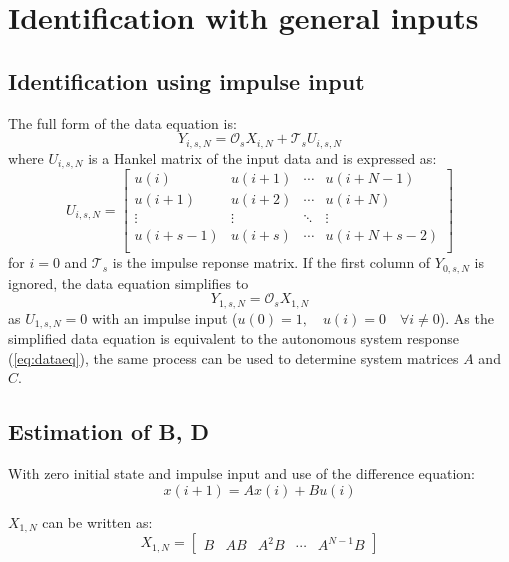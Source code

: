 \documentclass[11pt,a4paper]{article}
\begin{document}
\section{Identification with general inputs}

\subsection{Identification using impulse input}
The full form of the data equation is:
\begin{equation}
    \label{eq:fulldataeq}
    Y_{i, s, N} = \mathcal{O}_s X_{i, N} + \mathcal{T}_s U_{i, s, N}
\end{equation}
where $U_{i, s, N}$ is a Hankel matrix of the input data and is expressed as:
\begin{equation}
    \label{eq:uhankel}
    U_{i, s, N} =
        \begin{bmatrix}
            u(i) & u(i + 1) & \cdots & u(i + N - 1) \\
            u(i + 1) & u(i + 2) & \cdots & u(i + N) \\
            \vdots & \vdots & \ddots & \vdots \\
            u(i + s - 1) & u(i + s) & \cdots & u(i + N + s - 2) \\
        \end{bmatrix}
\end{equation}
for $i = 0$  and $\mathcal{T}_s$ is the impulse reponse matrix.
If the first column of $Y_{0, s, N}$ is ignored, the data equation simplifies
to
\begin{equation}
    \label{eq:simpdataeq}
    Y_{1, s, N} = \mathcal{O}_s X_{1, N}
\end{equation}
as $U_{1, s, N} = 0$ with an impulse input ($u(0) = 1, \quad u(i) = 0 \quad
\forall i \neq 0$).
As the simplified data equation is equivalent to the autonomous system response
(\autoref{eq:dataeq}), the same process can be used to determine system
matrices $A$ and $C$.

\subsection{Estimation of B, D}
With zero initial state and impulse input and use of the difference equation:
\begin{equation}
    \label{eq:diffeq}
    x(i + 1) = Ax(i) + Bu(i)
\end{equation}

$X_{1, N}$ can be written as:
\begin{equation}
    \label{eq:simpxhankel}
    X_{1, N} = \begin{bmatrix}
        B & AB & A^2B & \cdots & A^{N-1}B
    \end{bmatrix}
\end{equation}
\end{document}
